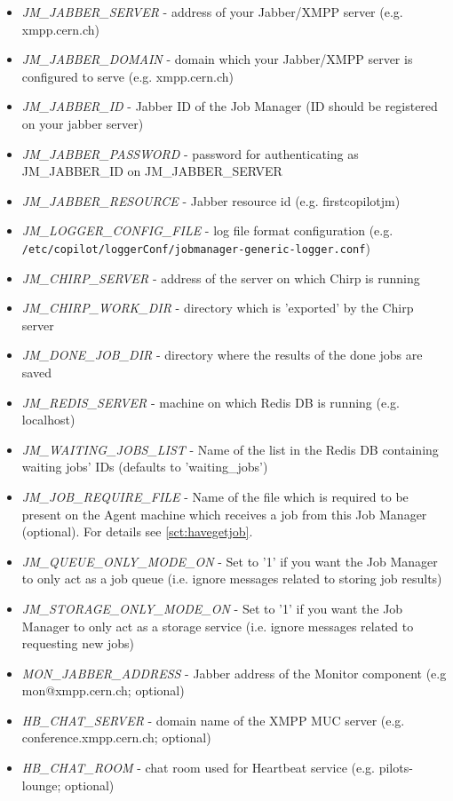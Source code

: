 \begin{itemize}
  \item \emph{JM\_JABBER\_SERVER} - address of your Jabber/XMPP server (e.g. xmpp.cern.ch)
  \item \emph{JM\_JABBER\_DOMAIN} - domain which your Jabber/XMPP server is configured to serve (e.g. xmpp.cern.ch)
  \item \emph{JM\_JABBER\_ID} - Jabber ID of the Job Manager (ID should be registered on your jabber server)
  \item \emph{JM\_JABBER\_PASSWORD} - password for authenticating as JM\_JABBER\_ID on JM\_JABBER\_SERVER
  \item \emph{JM\_JABBER\_RESOURCE} - Jabber resource id (e.g. firstcopilotjm)
  \item \emph{JM\_LOGGER\_CONFIG\_FILE} - log file format configuration (e.g. \texttt{/etc/copilot/loggerConf/jobmanager-generic-logger.conf})
  \item \emph{JM\_CHIRP\_SERVER} - address of the server on which Chirp is running
  \item \emph{JM\_CHIRP\_WORK\_DIR} - directory which is 'exported' by the Chirp server
  \item \emph{JM\_DONE\_JOB\_DIR} - directory where the results of the done jobs are saved
  \item \emph{JM\_REDIS\_SERVER} - machine on which Redis DB is running (e.g. localhost)
  \item \emph{JM\_WAITING\_JOBS\_LIST} - Name of the list in the Redis DB containing waiting jobs' IDs (defaults to 'waiting\_jobs')
  \item \emph{JM\_JOB\_REQUIRE\_FILE} - Name of the file which is required to be present on the Agent machine which receives a job from this Job Manager (optional). For details see \ref{sct:havegetjob}.
  \item \emph{JM\_QUEUE\_ONLY\_MODE\_ON} - Set to '1' if you want the Job Manager to only act as a job queue (i.e. ignore messages related to storing job results)
  \item \emph{JM\_STORAGE\_ONLY\_MODE\_ON} - Set to '1' if you want the Job Manager to only act as a storage service (i.e. ignore messages related to requesting new jobs)
  \item \emph{MON\_JABBER\_ADDRESS} - Jabber address of the Monitor component (e.g mon@xmpp.cern.ch; optional)
  \item \emph{HB\_CHAT\_SERVER} - domain name of the XMPP MUC server (e.g. conference.xmpp.cern.ch; optional)
  \item \emph{HB\_CHAT\_ROOM} - chat room used for Heartbeat service (e.g. pilots-lounge; optional)
 \end{itemize}

